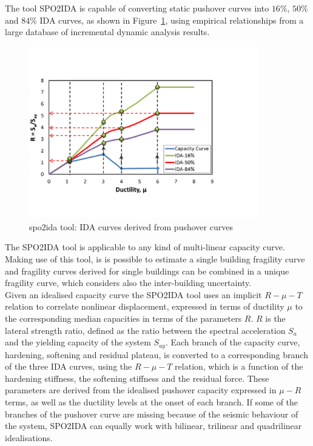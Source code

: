 The tool SPO2IDA \citep{VamvatsikosCornell2005} is capable of converting static pushover curves into $16\%$, $50\%$ and $84\%$ IDA curves, as shown in Figure~\ref{fig:spo2ida}, using empirical relationships from a large database of incremental dynamic analysis results.

\begin{figure}[!htbp]
\centering
\includegraphics[width=10cm]{figures/spo2ida.jpg}
\caption{spo2ida tool: IDA curves derived from pushover curves}
\label{fig:spo2ida}
\end{figure}

The SPO2IDA tool is applicable to any kind of multi-linear capacity curve. Making use of this tool, is is possible to estimate a single building fragility curve and fragility curves derived for single buildings can be combined in a unique fragility curve, which considers also the inter-building uncertainty.\\

Given an idealised capacity curve the SPO2IDA tool uses an implicit $R-\mu-T$ relation to correlate nonlinear displacement, expressed in terms of ductility $\mu$ to the corresponding median capacities in terms of the parameters $R$. $R$ is the lateral strength ratio, defined as the ratio between the spectral acceleration $S_a$ and the yielding capacity of the system $S_{ay}$. Each branch of the capacity curve, hardening, softening and residual plateau, is converted to a corresponding branch of the three IDA curves, using the $R-\mu-T$ relation, which is a function of the hardening stiffness, the softening stiffness and the residual force. These parameters are derived from the idealised pushover capacity expressed in $\mu-R$ terms, as well as the ductility levels at the onset of each branch. If some of the branches of the pushover curve are missing because of the seismic behaviour of the system, SPO2IDA can equally work with bilinear, trilinear and quadrilinear idealisations.\\

